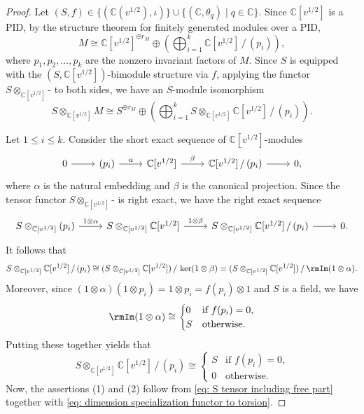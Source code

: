 \documentclass[12pt, reqno]{amsart}
\theoremstyle{plain}
\theoremstyle{definition}
\numberwithin{equation}{section}
\numberwithin{figure}{section}
\numberwithin{table}{section}
\def\C{\mathbb C}
\begin{document}
\begin{proof}
Let $(S,f) \in \{(\C(v^{1/2}), \iota)\} \cup \{ (\C, \theta_q) \mid q \in \C\}$.
Since $\C[v^{1/2}]$ is a PID, 
by the structure theorem for finitely generated modules over a PID, 
\[
M \cong \C[v^{1/2}]^{\oplus r_M} \oplus
\left( \bigoplus_{i=1}^k \C[v^{1/2}]\,/\,(p_i) \right),
\]
where $p_1, p_2, \ldots, p_k$ are the nonzero invariant factors 
of $M$.
Since $S$ is equipped with the $(S, \C[v^{1/2}])$-bimodule structure via $f$, 
applying the functor $S \otimes_{\C[v^{1/2}]} \text{-}$ to both sides, we have an $S$-module isomorphism
\begin{equation}\label{eq: S tensor including free part}
S \otimes_{\C[v^{1/2}]} M \cong 
S^{\oplus r_M} 
\oplus 
\left( \bigoplus_{i=1}^k S \otimes_{\C[v^{1/2}]} \C[v^{1/2}]\,/\,(p_i) \right).
\end{equation}

Let $1 \le i \le k$.
Consider the short exact sequence of $\C[v^{1/2}]$-modules
\[
\begin{tikzcd}
0 \arrow[r] & (p_i) \arrow[r, "\alpha"] & \C[v^{1/2}] \arrow[r, "\beta"] & \C[v^{1/2}] \, / \, (p_i) \arrow[r] & 0,
\end{tikzcd}
\]
where $\alpha$ is the natural embedding and $\beta$ is the canonical projection.
Since the tensor functor $S \otimes_{\C[v^{1/2}]} \text{-}$ is right exact, we have the right exact sequence
\[
\begin{tikzcd}
S \otimes_{\C[v^{1/2}]} (p_i) \arrow[r, "1 \otimes \alpha"] 
& S \otimes_{\C[v^{1/2}]} \C[v^{1/2}] \arrow[r, "1 \otimes \beta"] 
& S \otimes_{\C[v^{1/2}]} \C[v^{1/2}] \, / \, (p_i) \arrow[r] 
& 0.
\end{tikzcd}
\]
It follows that
\[
S \otimes_{\C[v^{1/2}]}\C[v^{1/2}] \, / \, (p_i)
\cong 
(S \otimes_{\C[v^{1/2}]} \C[v^{1/2}]) \, / \, \ker(1 \otimes \beta) = (S \otimes_{\C[v^{1/2}]} \C[v^{1/2}]) \, / \, \rmIm(1 \otimes \alpha).
\]
Moreover, since  $(1 \otimes \alpha) (1 \otimes p_i) = 1 \otimes p_i =  f(p_i) \otimes 1$ and $S$ is a field,  we have
\[
\rmIm(1 \otimes \alpha) \cong \begin{cases}
0  & \text{if $f(p_i) = 0$,}\\
S & \text{otherwise.}
\end{cases}
\]
Putting these together yields that
\begin{equation}\label{eq: dimension specialization functor to torsion}
S \otimes_{\C[v^{1/2}]} \C[v^{1/2}] \, / \, (p_i) 
\cong \begin{cases}
S  & \text{if $f(p_i) = 0$,}\\
0  & \text{otherwise.}
\end{cases}
\end{equation}
Now, the assertions (1) and (2) follow from 
\cref{eq: S tensor including free part} together with \cref{eq: dimension specialization functor to torsion}.
\end{proof}
\end{document}
